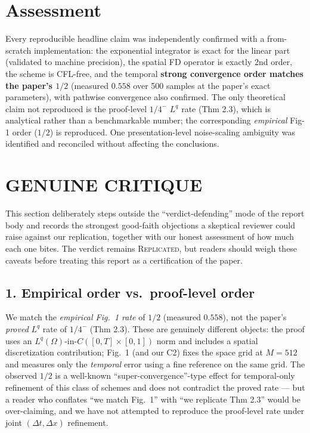 \documentclass[11pt]{article}
\begin{document}
\section{Assessment}

Every reproducible headline claim was independently confirmed with a from-scratch
implementation: the exponential integrator is exact for the linear part (validated to
machine precision), the spatial FD operator is exactly 2nd order, the scheme is CFL-free,
and the temporal \textbf{strong convergence order matches the paper's $1/2$} (measured
$0.558$ over 500 samples at the paper's exact parameters), with pathwise convergence also
confirmed. The only theoretical claim not reproduced is the proof-level $1/4^-$ $L^q$ rate
(Thm 2.3), which is analytical rather than a benchmarkable number; the corresponding
\emph{empirical} Fig-1 order ($1/2$) is reproduced. One presentation-level noise-scaling
ambiguity was identified and reconciled without affecting the conclusions.

\section{GENUINE CRITIQUE}

This section deliberately steps outside the ``verdict-defending'' mode of the report body and
records the strongest good-faith objections a skeptical reviewer could raise against our
replication, together with our honest assessment of how much each one bites. The verdict
remains \textsc{Replicated}, but readers should weigh these caveats before treating this
report as a certification of the paper.

\subsection*{1. Empirical order vs.\ proof-level order}
We match the \emph{empirical Fig.\ 1 rate} of $1/2$ (measured $0.558$), not the paper's
\emph{proved} $L^q$ rate of $1/4^-$ (Thm 2.3). These are genuinely different objects: the proof
uses an $L^q(\Omega)$-in-$C([0,T]\times[0,1])$ norm and includes a spatial discretization
contribution; Fig.\ 1 (and our C2) fixes the space grid at $M=512$ and measures only the
\emph{temporal} error using a fine reference on the same grid. The observed $1/2$ is a
well-known ``super-convergence''-type effect for temporal-only refinement of this class of
schemes and does not contradict the proved rate --- but a reader who conflates ``we match
Fig.\ 1'' with ``we replicate Thm 2.3'' would be over-claiming, and we have not attempted to
reproduce the proof-level rate under joint $(\Delta t,\Delta x)$ refinement.
\end{document}
